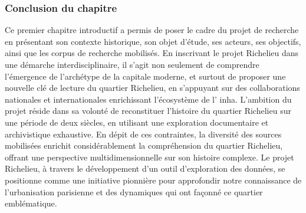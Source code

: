 \subsubsection{Conclusion du chapitre}
Ce premier chapitre introductif a permis de poser le cadre du projet de recherche en présentant son contexte historique, son objet d'étude, ses acteurs, ses objectifs, ainsi que les corpus de recherche mobilisés. En inscrivant le projet Richelieu dans une démarche interdisciplinaire, il s'agit non seulement de comprendre l'émergence de l'archétype de la capitale moderne, et surtout de proposer une nouvelle clé de lecture du quartier Richelieu, en s'appuyant sur des collaborations nationales et internationales enrichissant l'écosystème de l' \acrshort{inha}. L'ambition du projet réside dans sa volonté de reconstituer l'histoire du quartier Richelieu sur une période de deux siècles, en utilisant une exploration documentaire et archivistique exhaustive. En dépit de ces contraintes, la diversité des sources mobilisées enrichit considérablement la compréhension du quartier Richelieu, offrant une perspective multidimensionnelle sur son histoire complexe. Le projet Richelieu, à travers le développement d'un outil d'exploration des données, se positionne comme une initiative pionnière pour approfondir notre connaissance de l'urbanisation parisienne et des dynamiques qui ont façonné ce quartier emblématique.